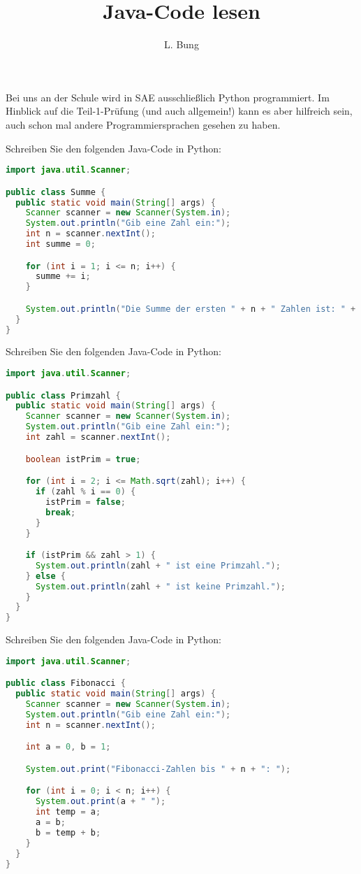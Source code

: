 \documentclass[11pt, a4paper, oneside]{article}
\begin{document}
	\author{L. Bung}
	\title{Java-Code lesen}
	\subject{SAE}
	\maketitle
	
	Bei uns an der Schule wird in SAE ausschließlich Python programmiert.
	Im Hinblick auf die Teil-1-Prüfung (und auch allgemein!) kann es aber hilfreich sein, auch schon mal andere Programmiersprachen gesehen zu haben.
	
	
	Schreiben Sie den folgenden Java-Code in Python:

	\begin{lstlisting}[language=java]
import java.util.Scanner;

public class Summe {
  public static void main(String[] args) {
    Scanner scanner = new Scanner(System.in);
    System.out.println("Gib eine Zahl ein:");
    int n = scanner.nextInt();
    int summe = 0;

    for (int i = 1; i <= n; i++) {
      summe += i;
    }

    System.out.println("Die Summe der ersten " + n + " Zahlen ist: " + summe);
  }
}
	\end{lstlisting}
	
	
	
	Schreiben Sie den folgenden Java-Code in Python:
	
	\begin{lstlisting}[language=java]
import java.util.Scanner;

public class Primzahl {
  public static void main(String[] args) {
    Scanner scanner = new Scanner(System.in);
    System.out.println("Gib eine Zahl ein:");
    int zahl = scanner.nextInt();

    boolean istPrim = true;

    for (int i = 2; i <= Math.sqrt(zahl); i++) {
      if (zahl % i == 0) {
        istPrim = false;
        break;
      }
    }

    if (istPrim && zahl > 1) {
      System.out.println(zahl + " ist eine Primzahl.");
    } else {
      System.out.println(zahl + " ist keine Primzahl.");
    }
  }
}
	\end{lstlisting}
	
	
	
	Schreiben Sie den folgenden Java-Code in Python:
	
	\begin{lstlisting}[language=java]
import java.util.Scanner;

public class Fibonacci {
  public static void main(String[] args) {
    Scanner scanner = new Scanner(System.in);
    System.out.println("Gib eine Zahl ein:");
    int n = scanner.nextInt();

    int a = 0, b = 1;

    System.out.print("Fibonacci-Zahlen bis " + n + ": ");

    for (int i = 0; i < n; i++) {
      System.out.print(a + " ");
      int temp = a;
      a = b;
      b = temp + b;
    }
  }
}
	\end{lstlisting}
\end{document}
